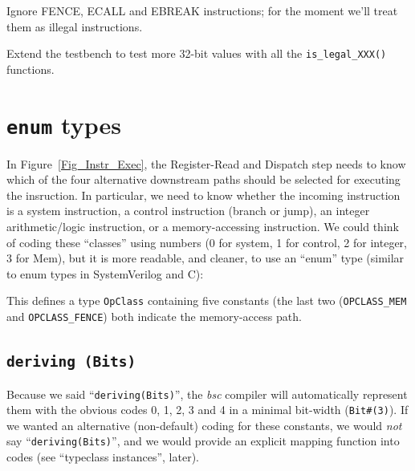 Ignore FENCE, ECALL and EBREAK instructions; for the moment we'll
treat them as illegal instructions.

\Exercise

Extend the testbench to test more 32-bit values with all the
\verb|is_legal_XXX()| functions.

\Endexercise


\section{{\tt enum} types}

\label{BSV_enum_types}


In Figure~\ref{Fig_Instr_Exec}, the Register-Read and Dispatch step
needs to know which of the four alternative downstream paths should be
selected for executing the insruction.  In particular,
we need to know whether the incoming instruction is a system
instruction, a control instruction (branch or jump), an integer
arithmetic/logic instruction, or a memory-accessing instruction.  We
could think of coding these ``classes'' using numbers (0 for system, 1
for control, 2 for integer, 3 for Mem), but it is more readable, and
cleaner, to use an ``enum'' type (similar to enum types in
SystemVerilog and C):



This defines a type \verb|OpClass| containing five constants (the last
two (\verb|OPCLASS_MEM| and \verb|OPCLASS_FENCE|) both indicate the
memory-access path.


\subsection{{\tt deriving (Bits)}}


Because we said ``\verb|deriving(Bits)|'', the \emph{bsc} compiler
will automatically represent them with the obvious codes 0, 1, 2, 3
and 4 in a minimal bit-width (\verb|Bit#(3)|).  If we wanted an
alternative (non-default) coding for these constants, we would
\emph{not} say ``\verb|deriving(Bits)|'', and we would provide an
explicit mapping function into codes (see ``typeclass instances'',
later).

